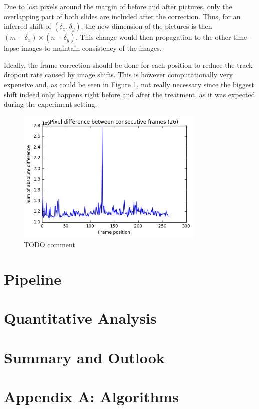 \documentclass[pdftex,12pt,a4paper]{report}
\begin{document}
Due to lost pixels around the margin of before and after pictures, only the overlapping part of both slides are included after the correction. Thus, for an inferred shift of $(\delta_x, \delta_y)$, the new dimension of the pictures is then $(m - \delta_x) \times (n - \delta_y)$. This change would then propagation to the other time-lapse images to maintain consistency of the images.

Ideally, the frame correction should be done for each position to reduce the track dropout rate caused by image shifts. This is however computationally very expensive and, as could be seen in Figure \ref{fig:pixdiff}, not really necessary since the biggest shift indeed only happens right before and after the treatment, as it was expected during the experiment setting.

\begin{figure}[h]
\centering
\includegraphics[width=0.8\textwidth]{pixdiff}
\caption{TODO comment}
\label{fig:pixdiff}
\end{figure}

\chapter{Pipeline}

\chapter{Quantitative Analysis}

\chapter{Summary and Outlook}

\chapter*{Appendix A: Algorithms}
\end{document}
